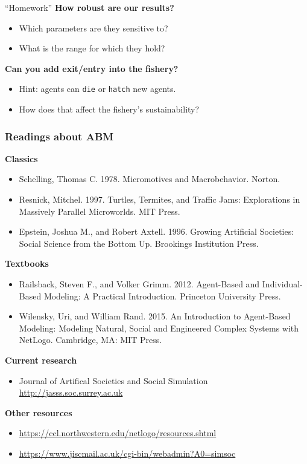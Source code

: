\documentclass[table, 14pt, aspectratio=169]{beamer}
\newcommand{\hl}[1]{\textcolor{OxfordBlue}{\textbf{#1}}}
\begin{document}
\begin{frame}{``Homework''}
  \vfill
  \hl{How robust are our results?}
  \begin{itemize}
    \item Which parameters are they sensitive to?
    \item What is the range for which they hold?
  \end{itemize}
  \vfill
  \hl{Can you add exit/entry into the fishery?}
  \begin{itemize}
    \item Hint: agents can \texttt{die} or \texttt{hatch} new agents.
    \item How does that affect the fishery's sustainability?
  \end{itemize}
  \vfill
\end{frame}


\begin{frame}[t]\frametitle{Readings about ABM}\scriptsize

    \vfill    
    \hl{Classics}
    \begin{itemize}
      \item Schelling, Thomas C. 1978. Micromotives and Macrobehavior. Norton.
      \item Resnick, Mitchel. 1997. Turtles, Termites, and Traffic Jams: Explorations in Massively Parallel Microworlds. MIT Press.
      \item Epstein, Joshua M., and Robert Axtell. 1996. Growing Artificial Societies: Social Science from the Bottom Up. Brookings Institution Press.
    \end{itemize}

    \vfill    
    \hl{Textbooks}
    \begin{itemize}
      \item Railsback, Steven F., and Volker Grimm. 2012. Agent-Based and Individual-Based Modeling: A Practical Introduction. Princeton University Press.
      \item Wilensky, Uri, and William Rand. 2015. An Introduction to Agent-Based Modeling: Modeling Natural, Social and Engineered Complex Systems with NetLogo. Cambridge, MA: MIT Press.
    \end{itemize}

    \vfill    
    \hl{Current research}
    \begin{itemize}
      \item Journal of Artifical Societies and Social Simulation\\\url{http://jasss.soc.surrey.ac.uk}
    \end{itemize}


    \vfill    
    \hl{Other resources}
    \begin{itemize}
      \item \url{https://ccl.northwestern.edu/netlogo/resources.shtml}
      \item \url{https://www.jiscmail.ac.uk/cgi-bin/webadmin?A0=simsoc}
    \end{itemize}

\end{frame}
\end{document}
